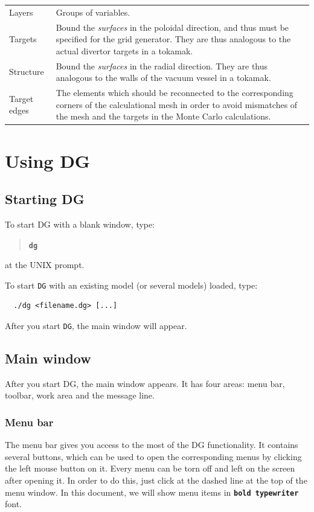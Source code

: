 \documentclass[12pt]{report}
\begin{document}
\begin{supertabular}{lp{300pt}}
Layers
 &  
Groups of variables.
 \\
 
Targets
 &  
Bound the \textit{surfaces} in the poloidal direction, and thus must be
specified for the grid generator.  They are thus analogous to the 
actual divertor targets in a tokamak.
 \\
Structure
& 
Bound the \textit{surfaces} in the radial direction.  They are thus
analogous to the walls of the vacuum vessel in a tokamak.
\\
Target edges
&
The elements which should be reconnected to the corresponding corners
of the calculational mesh in order to avoid mismatches of the mesh and
the targets in the Monte Carlo calculations. \\
\end{supertabular}
\vspace{2pt}


\chapter{Using DG}

\section{Starting DG}

To start DG with a blank window, type:
\begin{quote}
\textbf{\texttt{dg}}
\end{quote}
at the UNIX prompt.

To start \verb!DG! with an existing model (or several models) loaded, type:
\begin{verbatim}
  ./dg <filename.dg> [...]
\end{verbatim}

After you start \verb!DG!, the main window will appear.

\section{Main window}

After you start DG, the main window appears. It has four areas: menu
bar, toolbar, work area and the message line.

\subsection{Menu bar}

The menu bar gives you access to the most of the DG functionality. It
contains several buttons, which can be used to open the corresponding
menus by clicking the left mouse button on it. Every menu can be torn
off and left on the screen after opening it. In order to do this, just
click at the dashed line at the top of the menu window.  In this document,
we will show menu items in \textbf{\texttt{bold typewriter}} font.
\end{document}
